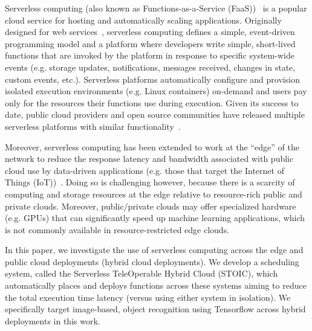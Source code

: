 Serverless computing (also known as Functions-as-a-Ser\-vice (FaaS))~\cite{ref:aws-lambda,ref:faas3,ref:afunctions-16} is a popular cloud service for hosting and automatically scaling applications. Originally designed for web services~\cite{ref:lambda-webservices,ref:lambda-microservices}, serverless computing defines a simple, event-driven programming model and a platform where developers write simple, short-lived functions that are invoked by the platform in response to specific system-wide events (e.g. storage updates, notifications, messages received, changes in state, custom events, etc.). Serverless platforms automatically configure and provision isolated execution environments (e.g. Linux containers) on-demand and users pay only for the resources their functions use during execution. Given its success to date, public cloud providers and open source communities have released multiple serverless platforms with similar functionality~\cite{ref:aws-lambda,ref:afunctions-16,ref:gfunctions-16,cspot19,ref:openwhisk-16,ref:ironio-16}.

Moreover, serverless computing has been extended to work at the ``edge'' of the network to reduce the response latency and bandwidth associated with public cloud use by data-driven applications (e.g.  those that target the Internet of Things (IoT))~\cite{ aws-greengrass, iothub-web, iotedge-web}. Doing so is challenging however, because there is a scarcity of computing and storage resources at the edge relative to resource-rich public and private clouds. Moreover, public/private clouds may offer specialized hardware (e.g. GPUs) that can significantly speed up machine learning applications, which is not commonly available in resource-restricted edge clouds.

In this paper, we investigate the use of serverless computing across the edge and public cloud deployments (hybrid cloud deployments). We develop a scheduling system, called the Serverless TeleOperable Hybrid Cloud (STOIC), which automatically places and deploys functions across these systems aiming to reduce the total execution time latency (versus using either system in isolation). We specifically target image-based, object recognition using Tensorflow across hybrid deployments in this work.

